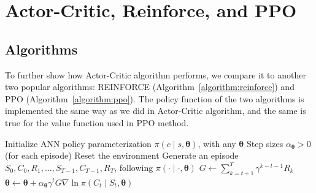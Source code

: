\documentclass{article}
\begin{document}
\section{Actor-Critic, Reinforce, and PPO}
\subsection{Algorithms}
\noindent To further show how Actor-Critic algorithm performs, we compare it 
to another two popular algorithms: REINFORCE
(Algorithm~\ref{algorithm:reinforce}) and PPO (Algorithm~\ref{algorithm:ppo}).
The policy function of the two algorithms is implemented the same way as we 
did in Actor-Critic algorithm, and the same is true for the value function 
used in PPO method.
\begin{algorithm}
    \caption{Reinforce for financial problem~\cite{Sutton1998}}
    \label{algorithm:reinforce}
    \begin{algorithmic}[1]
        \State Initialize ANN policy parameterization
        \(\pi\left(c\middle|s, \bm{\theta}\right)\), with any \(\bm{\theta}\)
        \State Step sizes \(\alpha_{\bm{\theta}}>0\)
        \Loop \hspace{0.3mm} (for each episode)
        \State Reset the environment
        \State Generate an episode 
        \(S_0, C_0, R_1, ..., S_{T-1}, C_{T-1}, R_T\),
        following \(\pi\left(\cdot\middle|\cdot, \bm{\theta}\right)\)
        \State \(G \gets \sum_{k=t+1}^{T} \gamma^{k-t-1}R_k\)
        \State \(\bm{\theta} \gets \bm{\theta} + \alpha_{\bm{\theta}}\gamma^t
        G\nabla{\ln{\pi\left(C_t\middle|S_t, \bm{\theta}\right)}}\)
        \EndFor
        \EndLoop
    \end{algorithmic}
\end{algorithm}
\end{document}
